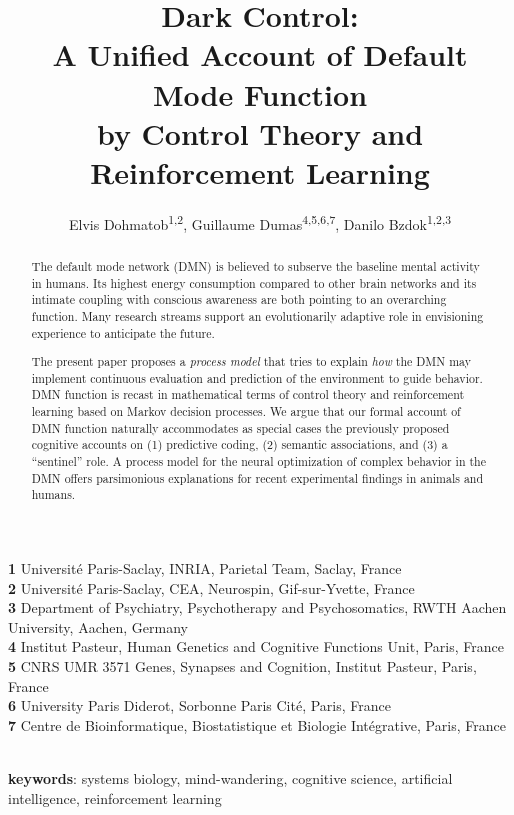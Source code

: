 \documentclass[10pt,letterpaper]{article}
\date{}
\title{Dark Control:\\
       A Unified Account of Default Mode Function\\
       by Control Theory and Reinforcement Learning}
\begin{document}
\author{Elvis Dohmatob\textsuperscript{1,2}, Guillaume Dumas\textsuperscript{4,5,6,7}, Danilo Bzdok\textsuperscript{1,2,3}
}

\maketitle
\small{
    \textbf{1} Universit\'e Paris-Saclay, INRIA, Parietal Team, Saclay, France\\
    \textbf{2} Universit\'e Paris-Saclay, CEA, Neurospin, Gif-sur-Yvette, France\\
    \textbf{3} Department of Psychiatry, Psychotherapy and Psychosomatics, RWTH Aachen University, Aachen, Germany\\
    \textbf{4} Institut Pasteur, Human Genetics and Cognitive Functions Unit, Paris, France\\
    \textbf{5} CNRS UMR 3571 Genes, Synapses and Cognition, Institut Pasteur, Paris, France\\
    \textbf{6} University Paris Diderot, Sorbonne Paris Cit\'e, Paris, France\\
    \textbf{7} Centre de Bioinformatique, Biostatistique et Biologie Intégrative, Paris, France
}

\begin{abstract}
The default mode network (DMN) is believed to subserve the
baseline mental activity in humans.
%
Its highest energy consumption compared to other brain networks and
its intimate coupling with conscious awareness are both pointing to
an overarching function.
%
Many research streams support an evolutionarily adaptive role in
envisioning experience to anticipate the future.


The present paper proposes a \textit{process model}
that tries to explain \textit{how}
the DMN may implement
continuous evaluation and prediction of the environment to guide behavior.
%
DMN function is recast in mathematical terms of
control theory and reinforcement learning based on Markov decision processes.
%
We argue that our formal account of DMN function naturally accommodates as special cases
the previously proposed cognitive accounts on
(1) predictive coding,
(2) semantic associations, and
(3) a ``sentinel'' role.
%
A process model for the neural optimization of complex behavior in the DMN
offers parsimonious explanations for
recent experimental findings in animals and humans.
\end{abstract}

\textbf{\\keywords}: systems biology, mind-wandering, cognitive science,
artificial intelligence,
reinforcement learning
\end{document}
